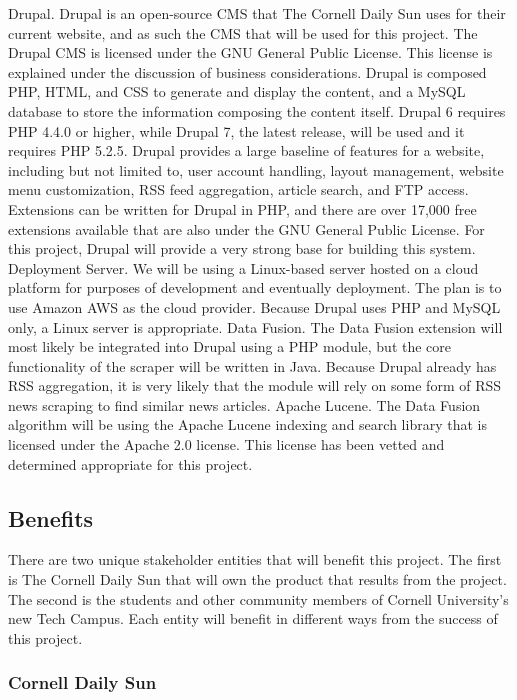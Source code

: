 \documentclass[12pt]{article} %
\begin{document}
Drupal. Drupal is an open-source CMS that The Cornell Daily Sun uses for their current website, and as such the CMS that will be used for this project. The Drupal CMS is licensed under the GNU General Public License. This license is explained under the discussion of business considerations. Drupal is composed PHP, HTML, and CSS to generate and display the content, and a MySQL database to store the information composing the content itself. Drupal 6 requires PHP 4.4.0 or higher, while Drupal 7, the latest release, will be used and it requires PHP 5.2.5. Drupal provides a large baseline of features for a website, including but not limited to, user account handling, layout management, website menu customization, RSS feed aggregation, article search, and FTP access. Extensions can be written for Drupal in PHP, and there are over 17,000 free extensions available that are also under the GNU General Public License. For this project, Drupal will provide a very strong base for building this system.
Deployment Server. We will be using a Linux-based server hosted on a cloud platform for purposes of development and eventually deployment. The plan is to use Amazon AWS as the cloud provider. Because Drupal uses PHP and MySQL only, a Linux server is appropriate.
Data Fusion. The Data Fusion extension will most likely be integrated into Drupal using a PHP module, but the core functionality of the scraper will be written in Java. Because Drupal already has RSS aggregation, it is very likely that the module will rely on some form of RSS news scraping to find similar news articles.
Apache Lucene. The Data Fusion algorithm will be using the Apache Lucene indexing and search library that is licensed under the Apache 2.0 license. This license has been vetted and determined appropriate for this project.
                    

\subsection{Benefits}

There are two unique stakeholder entities that will benefit this project. The first is The Cornell Daily Sun that will own the product that results from the project. The second is the students and other community members of Cornell University’s new Tech Campus. Each entity will benefit in different ways from the success of this project.
                   
\subsubsection{Cornell Daily Sun}
                   
\end{document}
